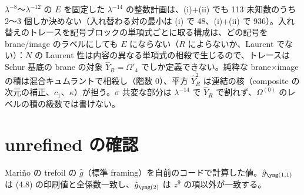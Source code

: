 \begin{compresult}\label{cr:n2negative}
$\lambda^{-8}$〜$\lambda^{-12}$ の $E$ を固定した $\lambda^{-14}$ の整数計画は、(i)+(ii) でも 113 未知数のうち 2〜3 個しか決めない（入れ替わる対の最小は (i) で 48、(i)+(ii) で 936）。入れ替えのトレースを記号ブロックの単項式ごとに取る構成は、どの記号を brane/image のラベルにしても $E$ にならない（$R$ によらないか、Laurent でない）：$N$ の Laurent 性は内容の異なる単項式の相殺で生じるので、トレースは Schur 基底の brane の対象 $\hat Y_R = \Omega'_4$ でしか定義できない。純粋な brane$\times$image の積は混合キュムラントで相殺し（階数 0）、平方 $\hat Y_R^2$ は連結の核（composite の次元の補正、$c_1$、$\kappa$）が担う。$\sigma$ 共変な部分は $\lambda^{-14}$ で $\hat Y_R$ で割れず、$\Omega^{(0)}$ のレベルの積の級数では書けない。
\end{compresult}

\section{unrefined の確認}\label{app:unref}
Mariño の trefoil の $\hat g$（標準 framing）を自前のコードで計算した値。$\hat g_{\yoneone}$ は \cite{Marino09} (4.8) の印刷値と全係数一致し、$\hat g_{\ytwo}$ は $z^9$ の項以外が一致する。


